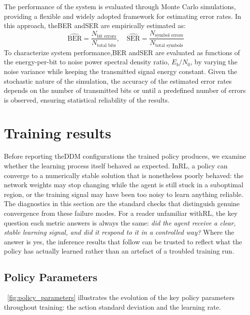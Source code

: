 The performance of the system is evaluated through Monte Carlo simulations, providing a flexible and widely adopted framework for estimating error rates. In this approach, the\gls{BER} and\gls{SER} are empirically estimated as:
\begin{equation}
    \widehat{\text{BER}} = \frac{N_{\text{bit errors}}}{N_{\text{total bits}}}, \quad
    \widehat{\text{SER}} = \frac{N_{\text{symbol errors}}}{N_{\text{total symbols}}}
\end{equation}
To characterize system performance,\gls{BER} and\gls{SER} are evaluated as functions of the energy-per-bit to noise power spectral density ratio, $E_b/N_0$, by varying the noise variance while keeping the transmitted signal energy constant. Given the stochastic nature of the simulation, the accuracy of the estimated error rates depends on the number of transmitted bits or until a predefined number of errors is observed, ensuring statistical reliability of the results.

\section{Training results}

Before reporting the\gls{DDM} configurations the trained policy produces, we examine whether the learning process itself behaved as expected. In\gls{RL}, a policy can converge to a numerically stable solution that is nonetheless poorly behaved: the network weights may stop changing while the agent is still stuck in a suboptimal region, or the training signal may have been too noisy to learn anything reliable. The diagnostics in this section are the standard checks that distinguish genuine convergence from these failure modes. For a reader unfamiliar with\gls{RL}, the key question each metric answers is always the same: \emph{did the agent receive a clear, stable learning signal, and did it respond to it in a controlled way?} Where the answer is yes, the inference results that follow can be trusted to reflect what the policy has actually learned rather than an artefact of a troubled training run.

\subsection{Policy Parameters}
\figurename~\ref{fig:policy_parameters} illustrates the evolution of the key policy parameters throughout training: the action standard deviation and the learning rate.

